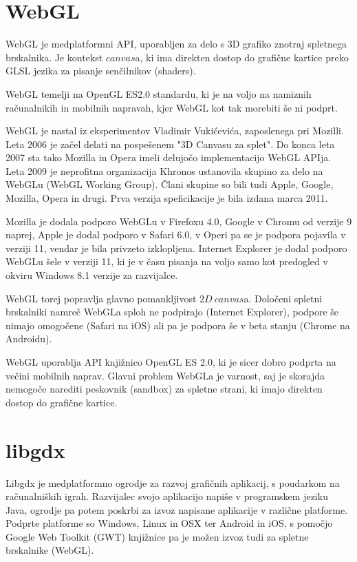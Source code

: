 \section{WebGL\cite{webgl}}

WebGL je medplatformni API, uporabljen za delo s 3D grafiko znotraj spletnega brskalnika. Je kontekst $canvas$a, ki ima direkten dostop do grafične kartice preko GLSL jezika za pisanje senčilnikov (shaders). 

WebGL temelji na OpenGL ES2.0 standardu, ki je na voljo na namiznih računalnikih in mobilnih napravah, kjer WebGL kot tak morebiti še ni podprt.

WebGL je nastal iz eksperimentov Vladimir Vukićevića, zaposlenega pri Mozilli. Leta 2006 je začel delati na pospešenem "3D Canvasu za splet". Do konca leta 2007 sta tako Mozilla in Opera imeli delujočo implementacijo WebGL APIja. Leta 2009 je neprofitna organizacija Khronos ustanovila skupino za delo na WebGLu (WebGL Working Group). Člani skupine so bili tudi Apple, Google, Mozilla, Opera in drugi. Prva verzija speficikacije je bila izdana marca 2011.

Mozilla je dodala podporo WebGLu v Firefoxu 4.0, Google v Chromu od verzije 9 naprej, Apple je dodal podporo v Safari 6.0, v Operi pa se je podpora pojavila v verziji 11, vendar je bila privzeto izklopljena. Internet Explorer je dodal podporo WebGLu šele v verziji 11, ki je v času pisanja na voljo samo kot predogled v okviru Windows 8.1  verzije za razvijalce.

WebGL torej popravlja glavno pomankljivost  $2D\ canvas$a. Določeni spletni brskalniki namreč WebGLa sploh ne podpirajo (Internet Explorer), podpore še nimajo omogočene (Safari na iOS) ali pa je podpora še v beta stanju (Chrome na Androidu).

WebGL uporablja API knjižnico OpenGL ES 2.0, ki je sicer dobro podprta na večini mobilnih naprav. Glavni problem WebGLa je varnost, saj je skorajda nemogoče narediti peskovnik (sandbox) za spletne strani, ki imajo direkten dostop do grafične kartice.

\section{libgdx\cite{libgdx}}

Libgdx je medplatformno ogrodje za razvoj grafičnih aplikacij, s poudarkom na računalniških igrah. Razvijalec svojo aplikacijo napiše v programskem jeziku Java, ogrodje pa potem poskrbi za izvoz napisane aplikacije v različne platforme. Podprte platforme so Windows, Linux in OSX ter Android in iOS, s pomočjo Google Web Toolkit (GWT) knjižnice pa je možen izvoz tudi za spletne brskalnike (WebGL).

